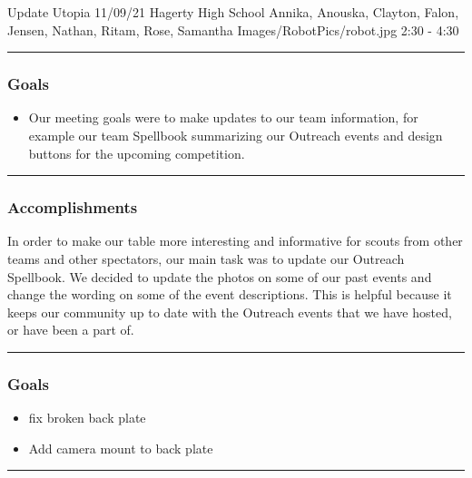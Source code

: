 \insertmeeting 
	{Update Utopia} 
	{11/09/21}
	{Hagerty High School}
	{Annika, Anouska, Clayton, Falon, Jensen, Nathan, Ritam, Rose, Samantha}
	{Images/RobotPics/robot.jpg}
	{2:30 - 4:30}
	
\noindent\hfil\rule{\textwidth}{.4pt}\hfil
\subsubsection*{Goals}
\begin{itemize}
    \item Our meeting goals were to make updates to our team information, for example our team Spellbook summarizing our Outreach events and design buttons for the upcoming competition. 

\end{itemize} 

\noindent\hfil\rule{\textwidth}{.4pt}\hfil

\subsubsection*{Accomplishments}
In order to make our table more interesting and informative for scouts from other teams and other spectators, our main task was to update our Outreach Spellbook. We decided to update the photos on some of our past events and change the wording on some of the event descriptions. This is helpful because it keeps our community up to date with the Outreach events that we have hosted, or have been a part of. 


\noindent\hfil\rule{\textwidth}{.4pt}\hfil
\subsubsection*{Goals}
\begin{itemize}
    \item fix broken back plate
	\item Add camera mount to back plate
 

\end{itemize} 

\noindent\hfil\rule{\textwidth}{.4pt}\hfil

